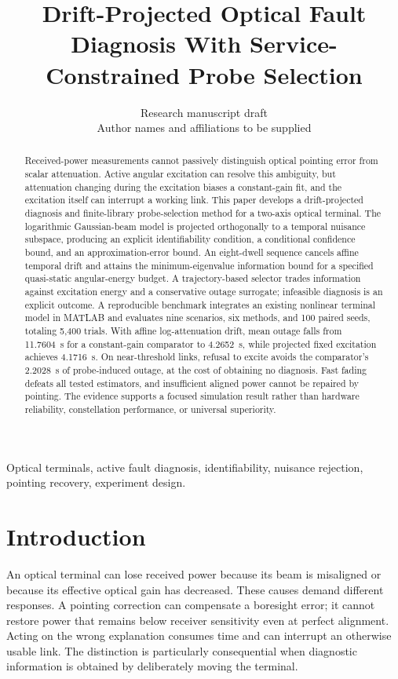 \documentclass[journal]{IEEEtran}
\begin{document}
\title{Drift-Projected Optical Fault Diagnosis With Service-Constrained Probe Selection}
\author{Research manuscript draft\\Author names and affiliations to be supplied}
\maketitle
\begin{abstract}
Received-power measurements cannot passively distinguish optical pointing error from scalar attenuation. Active angular excitation can resolve this ambiguity, but attenuation changing during the excitation biases a constant-gain fit, and the excitation itself can interrupt a working link. This paper develops a drift-projected diagnosis and finite-library probe-selection method for a two-axis optical terminal. The logarithmic Gaussian-beam model is projected orthogonally to a temporal nuisance subspace, producing an explicit identifiability condition, a conditional confidence bound, and an approximation-error bound. An eight-dwell sequence cancels affine temporal drift and attains the minimum-eigenvalue information bound for a specified quasi-static angular-energy budget. A trajectory-based selector trades information against excitation energy and a conservative outage surrogate; infeasible diagnosis is an explicit outcome. A reproducible benchmark integrates an existing nonlinear terminal model in MATLAB and evaluates nine scenarios, six methods, and 100 paired seeds, totaling 5,400 trials. With affine log-attenuation drift, mean outage falls from 11.7604~s for a constant-gain comparator to 4.2652~s, while projected fixed excitation achieves 4.1716~s. On near-threshold links, refusal to excite avoids the comparator's 2.2028~s of probe-induced outage, at the cost of obtaining no diagnosis. Fast fading defeats all tested estimators, and insufficient aligned power cannot be repaired by pointing. The evidence supports a focused simulation result rather than hardware reliability, constellation performance, or universal superiority.
\end{abstract}
\begin{IEEEkeywords}
Optical terminals, active fault diagnosis, identifiability, nuisance rejection, pointing recovery, experiment design.
\end{IEEEkeywords}

\section{Introduction}
An optical terminal can lose received power because its beam is misaligned or because its effective optical gain has decreased. These causes demand different responses. A pointing correction can compensate a boresight error; it cannot restore power that remains below receiver sensitivity even at perfect alignment. Acting on the wrong explanation consumes time and can interrupt an otherwise usable link. The distinction is particularly consequential when diagnostic information is obtained by deliberately moving the terminal.
\end{document}
